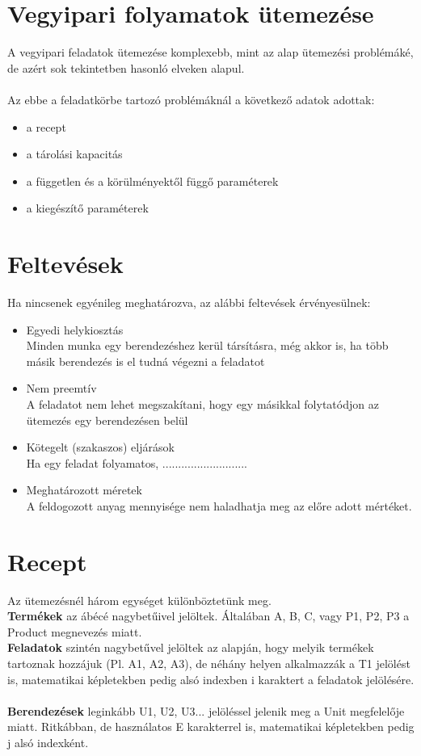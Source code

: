 \documentclass {report}
\begin{document}
 \subsection{}
 
 \section{Vegyipari folyamatok ütemezése}
 A vegyipari feladatok ütemezése komplexebb, mint az alap ütemezési problémáké, de azért sok tekintetben hasonló elveken alapul. \\ \\Az ebbe a feladatkörbe tartozó problémáknál a következő adatok adottak:
 
 \begin{itemize}
 \item  a recept
  \item a tárolási kapacitás
  \item a független és a körülményektől függő paraméterek
  \item  a kiegészítő paraméterek
 \end{itemize}
 
 \section{Feltevések}
 Ha nincsenek egyénileg meghatározva, az alábbi feltevések érvényesülnek:
 \begin{itemize}
 \item Egyedi helykiosztás\\Minden munka egy berendezéshez kerül társításra, még akkor is, ha több másik berendezés is el tudná végezni a feladatot
 \item Nem preemtív\\A feladatot nem lehet megszakítani, hogy egy másikkal folytatódjon az ütemezés egy berendezésen belül
 \item Kötegelt (szakaszos) eljárások\\Ha egy feladat folyamatos, ...........................
 \item Meghatározott méretek\\A feldogozott anyag mennyisége nem haladhatja meg az előre adott mértéket. 
  \end{itemize}
 \section{Recept}
 Az ütemezésnél három egységet különböztetünk meg.\\
 \textbf{Termékek} az ábécé nagybetűivel jelöltek. Általában A, B, C, vagy P1, P2, P3 a Product megnevezés miatt.\\
 \textbf{Feladatok} szintén nagybetűvel jelöltek az alapján, hogy melyik termékek tartoznak hozzájuk (Pl. A1, A2, A3), de néhány helyen alkalmazzák a T1 jelölést is, matematikai képletekben pedig alsó indexben i karaktert a feladatok jelölésére.\\ \\
 \textbf{Berendezések} leginkább U1, U2, U3... jelöléssel jelenik meg a Unit megfelelője miatt. Ritkábban, de használatos E karakterrel is, matematikai képletekben pedig j alsó indexként.\\
  
\end{document}
